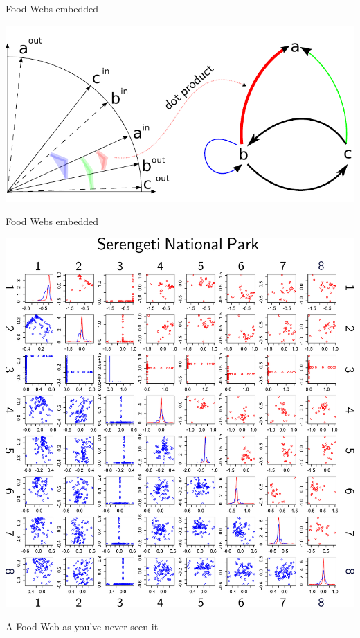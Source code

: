\documentclass[]{beamer}
\begin{document}
\begin{frame}{Food Webs embedded}


\centering
\includegraphics[width=0.9\linewidth]{images/RDPGmodel.pdf}

\end{frame}

\begin{frame}{Food Webs embedded}

\centering
  \includegraphics[width=0.6\linewidth]{images/Serengeti_scatter_8.pdf}

\centering
{\tiny A Food Web as you've never seen it}
 
\end{frame}
\end{document}
